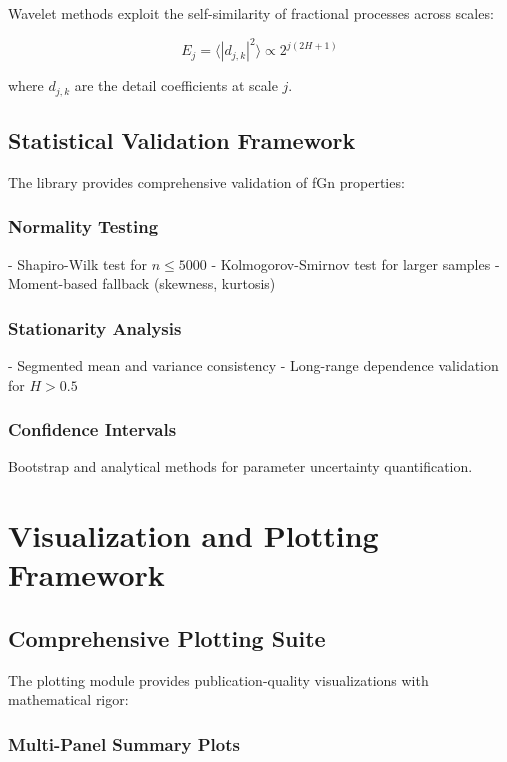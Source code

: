 \documentclass[11pt,a4paper]{article}
\begin{document}
Wavelet methods exploit the self-similarity of fractional processes across scales:

\begin{equation}
E_j = \langle |d_{j,k}|^2 \rangle \propto 2^{j(2H+1)}
\end{equation}

where $d_{j,k}$ are the detail coefficients at scale $j$.

\subsection{Statistical Validation Framework}

The library provides comprehensive validation of fGn properties:

\subsubsection{Normality Testing}
- Shapiro-Wilk test for $n \leq 5000$
- Kolmogorov-Smirnov test for larger samples
- Moment-based fallback (skewness, kurtosis)

\subsubsection{Stationarity Analysis}
- Segmented mean and variance consistency
- Long-range dependence validation for $H > 0.5$

\subsubsection{Confidence Intervals}
Bootstrap and analytical methods for parameter uncertainty quantification.

\section{Visualization and Plotting Framework}

\subsection{Comprehensive Plotting Suite}

The plotting module provides publication-quality visualizations with mathematical rigor:

\subsubsection{Multi-Panel Summary Plots}
\end{document}
